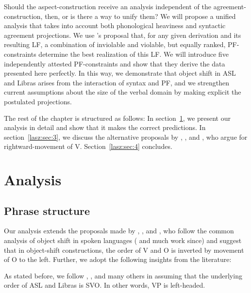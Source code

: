 \documentclass[output=paper,colorlinks,citecolor=brown,
]{langscibook}
\newcommand{\citeapos}[1]{\citeauthor{#1}'s \citeyearpar{#1}}
\begin{document}
Should the aspect-construction receive an analysis independent
of the agreement-construction, then, or is there a way to unify them?
We will propose a unified analysis that takes into account both
phonological heaviness and syntactic agreement projections. We use
\citeapos{Bobaljik.Wurmbrand.2012} proposal that, for any given
derivation and its resulting LF, a combination of inviolable and
violable, but equally ranked, PF-constraints determine the best
realization of this LF. We will introduce five independently attested
PF-constraints and show that they derive the data presented here
perfectly. In this way, we demonstrate that object shift in ASL and
Libras arises from the interaction of syntax and PF, and we strengthen
current assumptions about the size of the verbal domain by making
explicit the postulated projections.

The rest of the chapter is structured as follows: In section~\ref{lasz:sec:2}, we
present our analysis in detail and show that it makes the correct
predictions. In section~\ref{lasz:sec:3}, we discuss the alternative proposals by
\citet{Fischer.Janis.1992}, \citet{Matsuoka.1997}, and \citet{Braze.2004}, who
argue for rightward-movement of V. Section~\ref{lasz:sec:4} concludes.

\section{Analysis}
    \label{lasz:sec:2}
    
\subsection{Phrase structure}

Our analysis extends the proposals made by \citet{Quadros.etal.2004}, 
\citet{Quadros.DLM.2010}, and \citet{Gokgoz.2013}, who follow the
common analysis of object shift in spoken languages (\citealp{Holmberg:1986}
and much work since) and suggest that in object-shift constructions,
the order of V and O is inverted by movement of O to the left. Further,
we adopt the following insights from the literature:

As stated before, we follow \citet{Fischer.1975}, \citet{Liddell.1980},
\citet{Quadros.1999} and many others in assuming that the underlying order
of ASL and Libras is SVO. In other words, VP is left-headed.
\end{document}
